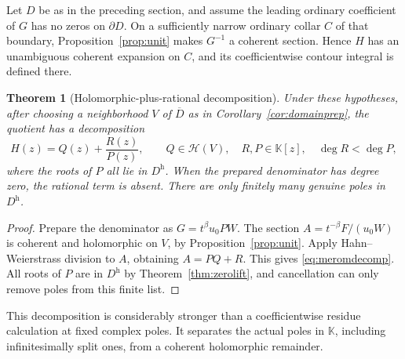 \documentclass[11pt,a4paper]{article}
\newtheorem{theorem}{Theorem}[section]
\theoremstyle{definition}\newtheorem{definition}[theorem]{Definition}
\theoremstyle{remark}\newtheorem{remark}[theorem]{Remark}
\newcommand{\K}{\mathbb K}
\newcommand{\A}{\mathscr H}\newcommand{\hol}{\mathcal O}
\newcommand{\halo}[1]{#1^{\mathrm h}}
\numberwithin{equation}{section}
\begin{document}
Let $D$ be as in the preceding section, and assume the leading ordinary coefficient of $G$ has no zeros on $\partial D$. On a sufficiently narrow ordinary collar $C$ of that boundary, Proposition~\ref{prop:unit} makes $G^{-1}$ a coherent section. Hence $H$ has an unambiguous coherent expansion on $C$, and its coefficientwise contour integral is defined there.

\begin{theorem}[Holomorphic-plus-rational decomposition]\label{thm:meromdecomp}
Under these hypotheses, after choosing a neighborhood $V$ of $\overline D$ as in Corollary~\ref{cor:domainprep}, the quotient has a decomposition
\begin{equation}\label{eq:meromdecomp}
 H(z)=Q(z)+\frac{R(z)}{P(z)},
 \qquad Q\in\A(V),\quad R,P\in\K[z],\quad\deg R<\deg P,
\end{equation}
where the roots of $P$ all lie in $\halo D$. When the prepared denominator has degree zero, the rational term is absent. There are only finitely many genuine poles in $\halo D$.
\end{theorem}
\begin{proof}
Prepare the denominator as $G=t^\beta u_0PW$. The section
$A=t^{-\beta}F/(u_0W)$ is coherent and holomorphic on $V$, by Proposition~\ref{prop:unit}. Apply Hahn--Weierstrass division to $A$, obtaining $A=PQ+R$. This gives \eqref{eq:meromdecomp}. All roots of $P$ are in $\halo D$ by Theorem~\ref{thm:zerolift}, and cancellation can only remove poles from this finite list.
\end{proof}
This decomposition is considerably stronger than a coefficientwise residue calculation at fixed complex poles. It separates the actual poles in $\K$, including infinitesimally split ones, from a coherent holomorphic remainder.
\end{document}
